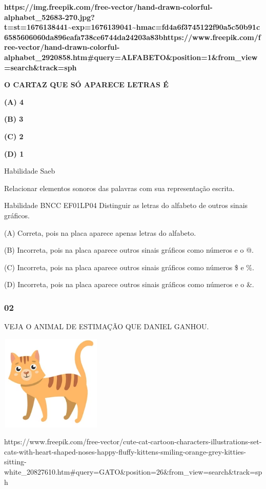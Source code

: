 \begin{escola}
\textbf{https://img.freepik.com/free-vector/hand-drawn-colorful-alphabet\_52683-270.jpg?t=st=1676138441\textasciitilde{}exp=1676139041\textasciitilde{}hmac=fd4a6f3745122f90a5c50b91c6585606060da896eafa738ce6744da24203a83bhttps://www.freepik.com/free-vector/hand-drawn-colorful-alphabet\_2920858.htm\#query=ALFABETO\&position=1\&from\_view=search\&track=sph}

\textbf{O CARTAZ QUE SÓ APARECE LETRAS É}

\textbf{(A) 4}

\textbf{(B) 3}

\textbf{(C) 2 }

\textbf{(D) 1}

Habilidade Saeb

Relacionar elementos sonoros das palavras com sua representação escrita.

Habilidade BNCC EF01LP04 Distinguir as letras do alfabeto de outros
sinais gráficos.

(A) Correta, pois na placa aparece apenas letras do alfabeto.

(B) Incorreta, pois na placa aparece outros sinais gráficos como números
e o @.

(C) Incorreta, pois na placa aparece outros sinais gráficos como números
\$ e \%.

(D) Incorreta, pois na placa aparece outros sinais gráficos como números
e o \&.

\subsubsection{02}\label{section-27}

VEJA O ANIMAL DE ESTIMAÇÃO QUE DANIEL GANHOU.

\includegraphics[width=1.91250in,height=1.79167in]{media/image187.png}

https://www.freepik.com/free-vector/cute-cat-cartoon-characters-illustrations-set-cats-with-heart-shaped-noses-happy-fluffy-kittens-smiling-orange-grey-kitties-sitting-white\_20827610.htm\#query=GATO\&position=26\&from\_view=search\&track=sph


\end{escola}
